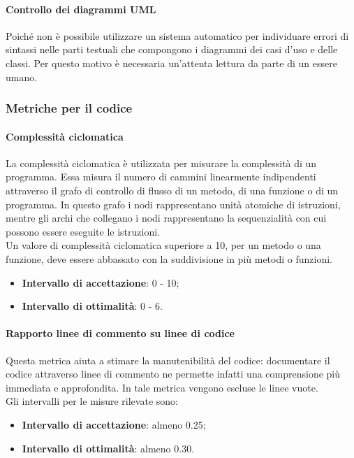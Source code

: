 \paragraph{Controllo dei diagrammi UML}
Poiché non è possibile utilizzare un sistema automatico per individuare errori di sintassi nelle parti testuali che compongono i diagrammi dei casi d’uso e delle classi. Per questo motivo è necessaria un’attenta lettura da parte di un essere umano.

\subsubsection{Metriche per il codice}
\paragraph{Complessità ciclomatica}
La complessità ciclomatica è utilizzata per misurare la complessità di un programma. Essa misura il numero di cammini linearmente indipendenti attraverso il grafo di controllo di flusso di un metodo, di una funzione o di un programma. In questo grafo i nodi rappresentano unità atomiche di istruzioni, mentre gli archi che collegano i nodi rappresentano la sequenzialità con cui possono essere eseguite le istruzioni.\\
Un valore di complessità ciclomatica superiore a 10, per un metodo o una funzione, deve essere abbassato con la suddivisione in più metodi o funzioni.
\begin{itemize}
\item \textbf{Intervallo di accettazione}: 0 - 10;
\item \textbf{Intervallo di ottimalità}: 0 - 6.
\end{itemize}

\paragraph{Rapporto linee di commento su linee di codice}
Questa metrica aiuta a stimare la manutenibilità del codice: documentare il codice attraverso linee di commento ne permette infatti una comprensione più immediata e approfondita. In tale metrica vengono escluse le linee vuote.\\
Gli intervalli per le misure rilevate sono:
\begin{itemize}
\item \textbf{Intervallo di accettazione}: almeno 0.25;
\item \textbf{Intervallo di ottimalità}: almeno 0.30.
\end{itemize}

